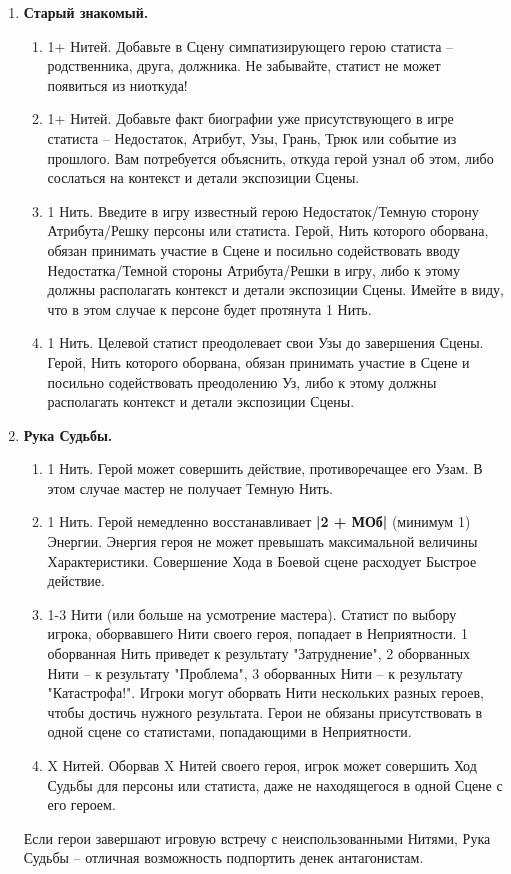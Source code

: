 \begin{enumerate}
    \item \textbf{Старый знакомый.}
    \begin{enumerate}
        \item 1+ Нитей. Добавьте в Сцену симпатизирующего герою статиста – родственника, друга, должника. Не забывайте, статист не может появиться из ниоткуда!
        \item 1+ Нитей. Добавьте факт биографии уже присутствующего в игре статиста – Недостаток, Атрибут, Узы, Грань, Трюк или событие из прошлого. Вам потребуется объяснить, откуда герой узнал об этом, либо сослаться на контекст и детали экспозиции Сцены.
        \item 1 Нить. Введите в игру известный герою Недостаток/Темную сторону Атрибута/Решку персоны или статиста. Герой, Нить которого оборвана, обязан принимать участие в Сцене и посильно содействовать вводу Недостатка/Темной стороны Атрибута/Решки в игру, либо к этому должны располагать контекст и детали экспозиции Сцены.
        \newline Имейте в виду, что в этом случае к персоне будет протянута 1 Нить.
        \item 1 Нить. Целевой статист преодолевает свои Узы до завершения Сцены. Герой, Нить которого оборвана, обязан принимать участие в Сцене и посильно содействовать преодолению Уз, либо к этому должны располагать контекст и детали экспозиции Сцены.
    \end{enumerate}

    \item \textbf{Рука Судьбы.}
	\begin{enumerate}
        \item 1 Нить. Герой может совершить действие, противоречащее его Узам. В этом случае мастер не получает Темную Нить.
        \item 1 Нить. Герой немедленно восстанавливает \textbf{|2 + МОб|} (минимум 1) Энергии. Энергия героя не может превышать максимальной величины Характеристики. Совершение Хода в Боевой сцене расходует Быстрое действие.
        \item 1-3 Нити (или больше на усмотрение мастера). Статист по выбору игрока, оборвавшего Нити своего героя, попадает в Неприятности. 1 оборванная Нить приведет к результату "Затруднение", 2 оборванных Нити – к результату "Проблема", 3 оборванных Нити – к результату "Катастрофа!". Игроки могут оборвать Нити нескольких разных героев, чтобы достичь нужного результата. Герои не обязаны присутствовать в одной сцене со статистами, попадающими в Неприятности.
        \item X Нитей. Оборвав X Нитей своего героя, игрок может совершить Ход Судьбы для персоны или статиста, даже не находящегося в одной Сцене с его героем.
    \end{enumerate}
    \begin{tcolorbox}
        Если герои завершают игровую встречу с неиспользованными Нитями, Рука Судьбы – отличная возможность подпортить денек антагонистам.
    \end{tcolorbox}


\end{enumerate}

